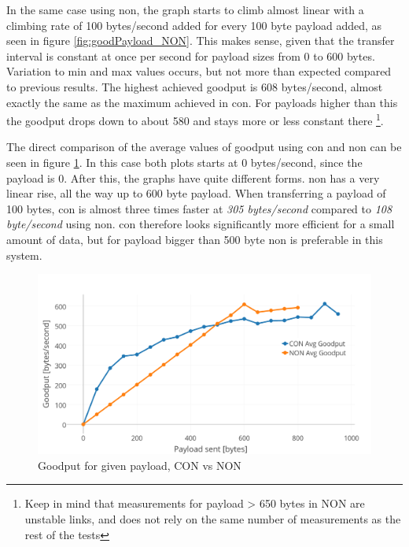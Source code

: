 \noindent In the same case using \gls{non}, the graph starts to climb almost linear with a climbing rate of 100 bytes/second added for every 100 byte payload added, as seen in figure \ref{fig:goodPayload_NON}. This makes sense, given that the transfer interval is constant at once per second for \gls{payload} sizes from 0 to 600 bytes. Variation to min and max values occurs, but not more than expected compared to previous results. The highest achieved \gls{goodput} is 608 bytes/second, almost exactly the same as the maximum achieved in \gls{con}. For \glspl{payload} higher than this the \gls{goodput} drops down to about 580 and stays more or less constant there \footnote{Keep in mind that measurements for payload > 650 bytes in NON are unstable links, and does not rely on the same number of measurements as the rest of the tests}.


\noindent The direct comparison of the average values of \gls{goodput} using \gls{con} and \gls{non} can be seen in figure \ref{fig:payloadGoodput_CONNON}. In this case both plots starts at 0 bytes/second, since the payload is 0. After this, the graphs have quite different forms. \gls{non} has a very linear rise, all the way up to 600 byte payload. When transferring a payload of 100 bytes, \gls{con} is almost three times faster at \textit{305 bytes/second} compared to \textit{108 byte/second} using \gls{non}. \gls{con} therefore looks significantly more efficient for a small amount of data, but for payload bigger than 500 byte \gls{non} is preferable in this system.

\begin{figure}[ht]
    \centering
    \includegraphics[width=1.0\textwidth]{payloadGoodput_CONNON.png}    
    \caption{Goodput for given payload, CON vs NON}
    \label{fig:payloadGoodput_CONNON}
\end{figure}
 


